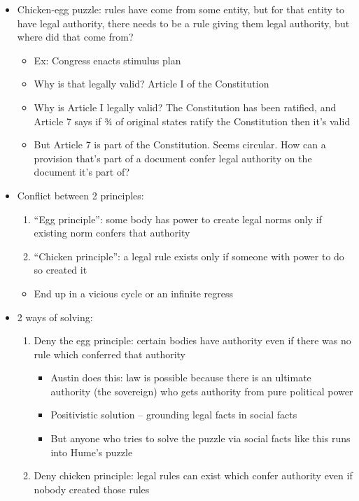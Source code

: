 \begin{itemize}
\tightlist
\item
  Chicken-egg puzzle: rules have come from some entity, but for that
  entity to have legal authority, there needs to be a rule giving them
  legal authority, but where did that come from?

  \begin{itemize}
  \tightlist
  \item
    Ex: Congress enacts stimulus plan
  \item
    Why is that legally valid? Article I of the Constitution
  \item
    Why is Article I legally valid? The Constitution has been ratified,
    and Article 7 says if ¾ of original states ratify the Constitution
    then it's valid
  \item
    But Article 7 is part of the Constitution. Seems circular. How can a
    provision that's part of a document confer legal authority on the
    document it's part of?
  \end{itemize}
\item
  Conflict between 2 principles:

  \begin{enumerate}
  \def\labelenumi{\arabic{enumi}.}
  \tightlist
  \item
    ``Egg principle'': some body has power to create legal norms only if
    existing norm confers that authority
  \item
    ``Chicken principle'': a legal rule exists only if someone with
    power to do so created it
  \end{enumerate}

  \begin{itemize}
  \tightlist
  \item
    End up in a vicious cycle or an infinite regress
  \end{itemize}
\item
  2 ways of solving:

  \begin{enumerate}
  \def\labelenumi{\arabic{enumi}.}
  \tightlist
  \item
    Deny the egg principle: certain bodies have authority even if there
    was no rule which conferred that authority

    \begin{itemize}
    \tightlist
    \item
      Austin does this: law is possible because there is an ultimate
      authority (the sovereign) who gets authority from pure political
      power
    \item
      Positivistic solution -- grounding legal facts in social facts
    \item
      But anyone who tries to solve the puzzle via social facts like
      this runs into Hume's puzzle
    \end{itemize}
  \item
    Deny chicken principle: legal rules can exist which confer authority
    even if nobody created those rules
  \end{enumerate}
\end{itemize}


